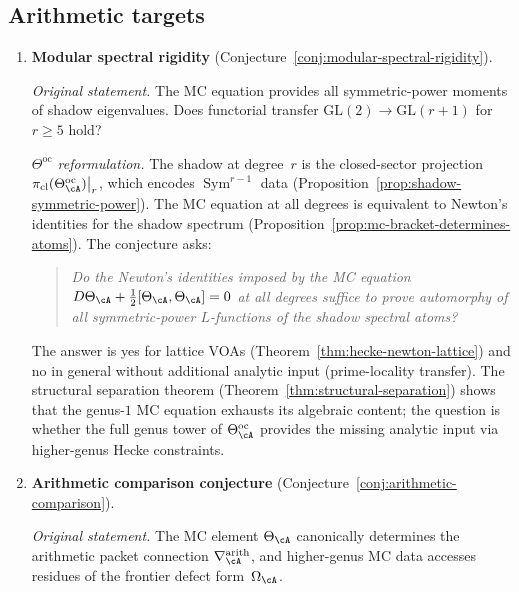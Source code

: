 \subsection{Arithmetic targets}

\begin{enumerate}[resume, label=\textup{(\arabic*)}]

\item \textbf{Modular spectral rigidity}
 (Conjecture~\ref{conj:modular-spectral-rigidity}).

 \smallskip\noindent
 \emph{Original statement.}
 The MC equation provides all symmetric-power moments of shadow
 eigenvalues. Does functorial transfer
 $\mathrm{GL}(2) \to \mathrm{GL}(r{+}1)$ for $r \geq 5$
 hold?

 \smallskip\noindent
 \emph{$\Theta^{\mathrm{oc}}$ reformulation.}
 The shadow at degree~$r$ is the closed-sector projection
 $\pi_{\mathrm{cl}}(\Theta^{\mathrm{oc}}_\cA)\big|_{r}$,
 which encodes $\operatorname{Sym}^{r-1}$ data
 (Proposition~\ref{prop:shadow-symmetric-power}). The MC
 equation at all degrees is equivalent to Newton's identities
 for the shadow spectrum
 (Proposition~\ref{prop:mc-bracket-determines-atoms}). The
 conjecture asks:
 \begin{quote}
 \emph{Do the Newton's identities imposed by the MC equation
 $D\Theta_\cA + \tfrac{1}{2}[\Theta_\cA, \Theta_\cA] = 0$
 at all degrees suffice to prove automorphy of all symmetric-power
 $L$-functions of the shadow spectral atoms?}
 \end{quote}
 The answer is yes for lattice VOAs
 (Theorem~\ref{thm:hecke-newton-lattice}) and no in general
 without additional analytic input (prime-locality transfer).
 The structural separation theorem
 (Theorem~\ref{thm:structural-separation}) shows that the
 genus-$1$ MC equation exhausts its algebraic content; the
 question is whether the full genus tower of
 $\Theta^{\mathrm{oc}}_\cA$ provides the missing analytic input
 via higher-genus Hecke constraints.

\item \textbf{Arithmetic comparison conjecture}
 (Conjecture~\ref{conj:arithmetic-comparison}).

 \smallskip\noindent
 \emph{Original statement.}
 The MC element $\Theta_\cA$ canonically determines the
 arithmetic packet connection $\nabla^{\mathrm{arith}}_\cA$,
 and higher-genus MC data accesses residues of the frontier
 defect form~$\Omega_\cA$.


\end{enumerate}
